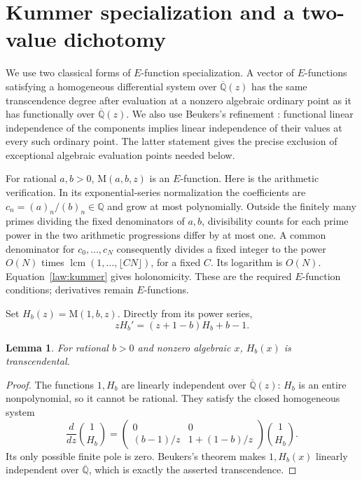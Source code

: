 \documentclass[11pt,a4paper]{article}
\newcommand{\Q}{\mathbb Q}
\newcommand{\Qbar}{\overline{\mathbb Q}}
\newcommand{\M}{\mathrm M}
\newtheorem{lemma}[theorem]{Lemma}
\theoremstyle{definition}
\theoremstyle{remark}
\numberwithin{equation}{section}
\begin{document}
\section{Kummer specialization and a two-value dichotomy}

We use two classical forms of $E$-function specialization. A vector
of $E$-functions satisfying a homogeneous differential system over
$\Qbar(z)$ has the same transcendence degree after evaluation at a
nonzero algebraic ordinary point as it has functionally over
$\Qbar(z)$. We also use Beukers's refinement
\cite[Corollary 1.4]{Beukers}: functional linear independence of the
components implies linear independence of their values at every such
ordinary point. The latter statement gives the precise exclusion of
exceptional algebraic evaluation points needed below.

For rational $a,b>0$, $\M(a,b,z)$ is an $E$-function. Here is the
arithmetic verification. In its exponential-series normalization the
coefficients are $c_n=(a)_n/(b)_n\in\Q$ and grow at most polynomially.
Outside the finitely many primes dividing the fixed denominators of
$a,b$, divisibility counts for each prime power in the two arithmetic
progressions differ by at most one. A common denominator for
$c_0,\ldots,c_N$ consequently divides a fixed integer to the power
$O(N)$ times $\operatorname{lcm}(1,\ldots,\lfloor CN\rfloor)$, for a
fixed $C$. Its logarithm is $O(N)$. Equation~\eqref{law:kummer} gives
holonomicity. These are the required $E$-function conditions;
derivatives remain $E$-functions.

Set $H_b(z)=\M(1,b,z)$. Directly from its power series,
\begin{equation}\label{law:firstorder}
 zH_b'=(z+1-b)H_b+b-1.
\end{equation}

\begin{lemma}\label{law:Htrans}
For rational $b>0$ and nonzero algebraic $x$, $H_b(x)$ is
transcendental.
\end{lemma}
\begin{proof}
The functions $1,H_b$ are linearly independent over $\Qbar(z)$:
$H_b$ is an entire nonpolynomial, so it cannot be rational. They satisfy
the closed homogeneous system
\[
 \frac d{dz}\binom{1}{H_b}
 =\begin{pmatrix}0&0\\(b-1)/z&1+(1-b)/z\end{pmatrix}
   \binom{1}{H_b}.
\]
Its only possible finite pole is zero. Beukers's theorem makes
$1,H_b(x)$ linearly independent over $\Qbar$, which is exactly the
asserted transcendence.
\end{proof}
\end{document}
